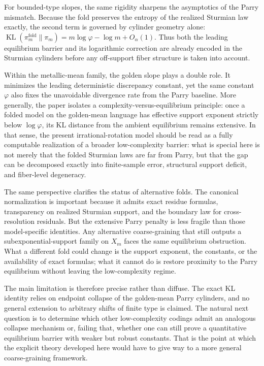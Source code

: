 \documentclass[11pt,letterpaper]{article}
\numberwithin{equation}{section}
\theoremstyle{plain}
\theoremstyle{definition}
\theoremstyle{remark}
\DeclareMathOperator{\KL}{KL}
\begin{document}
For bounded-type slopes, the same rigidity sharpens the asymptotics of the
Parry mismatch. Because the fold preserves the entropy of the realized
Sturmian law exactly, the second term is governed by cylinder geometry alone:
\(\KL(\pi_m^{\mathrm{fold}}\|\pi_m)=m\log\varphi-\log m+O_\alpha(1)\). Thus both
the leading equilibrium barrier and its logarithmic correction are already
encoded in the Sturmian cylinders before any off-support fiber structure is
taken into account.

Within the metallic-mean family, the golden slope plays a double role. It
minimizes the leading deterministic discrepancy constant, yet the same constant
\(\varphi\) also fixes the unavoidable divergence rate from the Parry baseline.
More generally, the paper isolates a complexity-versus-equilibrium principle:
once a folded model on the golden-mean language has effective support exponent
strictly below \(\log\varphi\), its KL distance from the ambient equilibrium
remains extensive. In that sense, the present irrational-rotation model should
be read as a fully computable realization of a broader low-complexity barrier:
what is special here is not merely that the folded Sturmian laws are far from
Parry, but that the gap can be decomposed exactly into finite-sample error,
structural support deficit, and fiber-level degeneracy.

The same perspective clarifies the status of alternative folds. The canonical
normalization is important because it admits exact residue formulas,
transparency on realized Sturmian support, and the boundary law for
cross-resolution residuals. But the extensive Parry penalty is less fragile
than those model-specific identities. Any alternative coarse-graining that
still outputs a subexponential-support family on \(X_m\) faces the same
equilibrium obstruction. What a different fold could change is the support
exponent, the constants, or the availability of exact formulas; what it cannot
do is restore proximity to the Parry equilibrium without leaving the
low-complexity regime.

The main limitation is therefore precise rather than diffuse. The exact KL
identity relies on endpoint collapse of the golden-mean Parry cylinders, and no
general extension to arbitrary shifts of finite type is claimed. The natural
next question is to determine which other low-complexity codings admit an
analogous collapse mechanism or, failing that, whether one can still prove a
quantitative equilibrium barrier with weaker but robust constants. That is the
point at which the explicit theory developed here would have to give way to a
more general coarse-graining framework.
\end{document}
